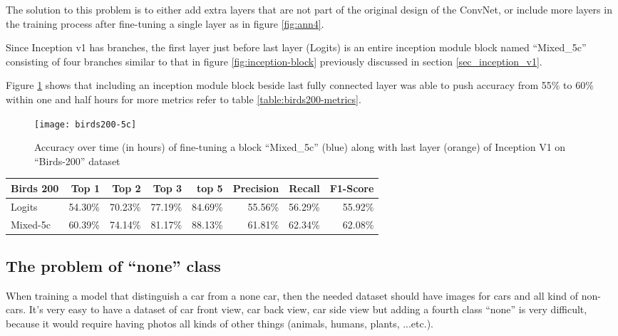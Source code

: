 The solution to this problem is to either add extra layers that are not part of the original design of the ConvNet,
or include more layers in the training process after fine-tuning a single layer as in figure \ref{fig:ann4}.

Since Inception v1 has branches, the first layer just before last layer (Logits) is an entire inception module block named
``Mixed\_5c'' consisting of four branches similar to that in figure \ref{fig:inception-block} previously discussed in section \ref{sec_inception_v1}.

Figure \ref{fig:fine-birds200-5c} shows that including an inception module block beside last fully connected layer
was able to push accuracy from 55\% to 60\% within one and half hours for more metrics refer to table \ref{table:birds200-metrics}.

\begin{figure}[!h]
\centering
\texttt{[image: birds200-5c]}
\caption{Accuracy over time (in hours) of fine-tuning a block ``Mixed\_5c'' (blue) along with last layer (orange) of Inception V1 on ``Birds-200'' dataset}\label{fig:fine-birds200-5c}
\end{figure}

\begin{table*}\caption{Performance metrics of fine-tuning single layer of Inception v1 on ``Birds-200'' Task}\label{table:birds200-metrics}
\centering
\begin{small}
\begin{tabularx}{\textwidth}{Xrrrrrrr}
\toprule
Birds 200 & Top 1   & Top 2 & Top 3 & top 5 & Precision & Recall & F1-Score \\
\midrule
Logits    & 54.30\% & 70.23\% & 77.19\% & 84.69\% & 55.56\% & 56.29\% & 55.92\% \\
Mixed-5c  & 60.39\% & 74.14\% & 81.17\% & 88.13\% & 61.81\% & 62.34\% & 62.08\% \\
\bottomrule
\end{tabularx}
\end{small}
\end{table*}


\subsection{The problem of ``none'' class}

When training a model that distinguish a car from a none car,
then the needed dataset should have images for cars and all kind of non-cars.
It's very easy to have a dataset of car front view, car back view, car side view
but adding a fourth class ``none'' is very difficult, because it would require
having photos all kinds of other things (animals, humans, plants, ...etc.).

